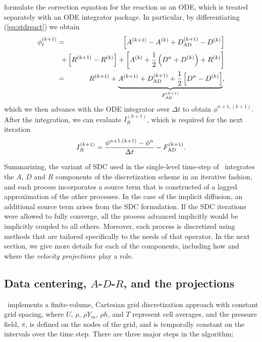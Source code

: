 formulate the correction equation for the 
reaction as an ODE, which is treated separately with an ODE integrator package.
In particular, by differentiating (\ref{eq:stdreact}) we obtain
\begin{eqnarray}
{\phi}^{(k+1)}_t &=& \left[ A^{(k+1)} - A^{(k)} + D_{\rm AD}^{(k+1)} - D^{(k)} \right]\nonumber\\
&&\hspace{-0.5cm}+ \left[R^{(k+1)} - R^{(k)}\right] + \left[A^{(k)} + \half\left(D^n + D^{(k)}\right) + R^{(k)}\right]\nonumber\\
&=& R^{(k+1)} + \underbrace{A^{(k+1)} + D_{\rm AD}^{(k+1)} + \half\left[D^n - D^{(k)}\right]}_{F_{\rm AD}^{(k+1)}}, \label{eq:MISDCint}
\end{eqnarray}
which we then advance with the ODE integrator over $\Delta t$ to obtain $\phi^{n+1,(k+1)}$.
After the integration, we can evaluate $I_R^{(k+1)}$, which is required for the next iteration
\begin{equation}
I_R^{(k+1)} = \frac{\phi^{n+1,(k+1)} - \phi^n}{\Delta t} - F_{\rm AD}^{(k+1)}.
\end{equation}

Summarizing, the variant of SDC used in the single-level time-step of \pelelm\ integrates the $A$, $D$ and $R$ components of the discretization scheme in an iterative fashion, and each process incorporates a source term that is constructed of a lagged approximation of the other processes. In the case of the implicit diffusion, an additional source term arises from the SDC formulation.  If the SDC iterations were allowed to fully converge, all the process advanced implicitly would be implicitly coupled to all others.  Moreover, each process is discretized using methods that are tailored specifically to the needs of that operator. In the next section, we give more details for each of the components, including how and where the \textit{velocity projections}\ play a role.


\subsection{Data centering, $A$-$D$-$R$, and the projections}
\pelelm\ implements a finite-volume, Cartesian grid discretization approach with constant grid spacing, where
$U$, $\rho$, $\rho Y_m$, $\rho h$, and $T$ represent cell averages, and the pressure field, $\pi$, is defined on the nodes
of the grid, and is temporally constant on the intervals over the time step. There are three major steps in the algorithm:\\

